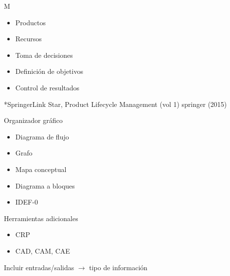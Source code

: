 M
\begin{itemize}
    \item Productos
    \item Recursos
    \item Toma de decisiones 
    \item Definición de objetivos 
    \item Control de resultados
\end{itemize}

*SpringerLink
Star, Product Lifecycle Management (vol 1) springer (2015)

Organizador gráfico
\begin{itemize}
    \item Diagrama de flujo
    \item Grafo
    \item Mapa conceptual
    \item Diagrama a bloques
    \item IDEF-0
\end{itemize}

Herramientas adicionales
\begin{itemize}
    \item CRP
    \item CAD, CAM, CAE
\end{itemize}

Incluir entradas/salidas \( \to \) tipo de información